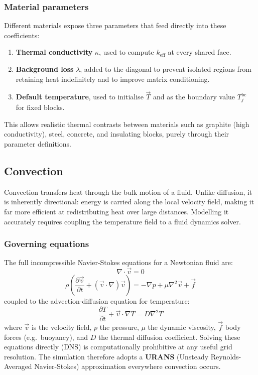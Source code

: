 \documentclass{report}
\begin{document}
\subsubsection*{Material parameters}

Different materials expose three parameters that feed directly into these coefficients:
\begin{enumerate}
    \item \textbf{Thermal conductivity} $\kappa$, used to compute $k_{\text{eff}}$ at every shared face.
    \item \textbf{Background loss} $\lambda$, added to the diagonal to prevent isolated
          regions from retaining heat indefinitely and to improve matrix conditioning.
    \item \textbf{Default temperature}, used to initialise $\vec{T}$ and as the boundary
          value $T_j^{\text{bc}}$ for fixed blocks.
\end{enumerate}
This allows realistic thermal contrasts between materials such as graphite (high conductivity),
steel, concrete, and insulating blocks, purely through their parameter definitions.

\subsection{Convection}

Convection transfers heat through the bulk motion of a fluid. Unlike diffusion, it
is inherently directional: energy is carried along the local velocity field, making
it far more efficient at redistributing heat over large distances. Modelling it
accurately requires coupling the temperature field to a fluid dynamics solver.

\subsubsection*{Governing equations}

The full incompressible Navier-Stokes equations for a Newtonian fluid are:
\[
\nabla \cdot \vec{v} = 0
\]
\[
\rho \left( \frac{\partial \vec{v}}{\partial t} + (\vec{v} \cdot \nabla)\vec{v} \right)
= -\nabla p + \mu \nabla^2 \vec{v} + \vec{f}
\]
coupled to the advection-diffusion equation for temperature:
\[
\frac{\partial T}{\partial t} + \vec{v} \cdot \nabla T = D \nabla^2 T
\]
where $\vec{v}$ is the velocity field, $p$ the pressure, $\mu$ the dynamic viscosity,
$\vec{f}$ body forces (e.g.\ buoyancy), and $D$ the thermal diffusion coefficient.
Solving these equations directly (DNS) is computationally prohibitive at any useful
grid resolution. The simulation therefore adopts a \textbf{URANS} (Unsteady
Reynolds-Averaged Navier-Stokes) approximation everywhere convection occurs.
\end{document}
